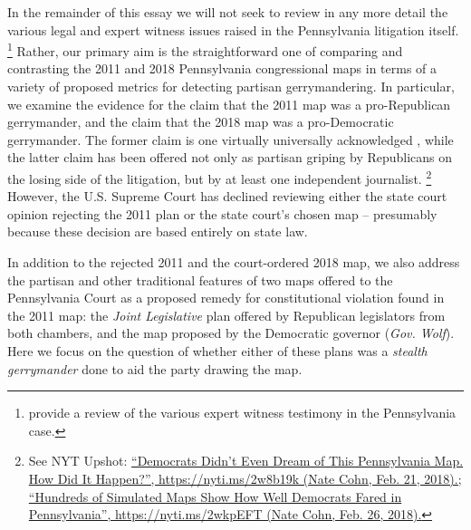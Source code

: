 \par
    In the remainder of this essay we will not seek to review in any more detail the various legal and expert witness issues raised in the Pennsylvania litigation itself.
        \footnote{\citet{Grofman_Cervas_2018_ELJ} provide a review of the various expert witness testimony in the Pennsylvania case.}
    Rather, our primary aim is the straightforward one of comparing and contrasting the 2011 and 2018 Pennsylvania congressional maps in terms of a variety of proposed metrics for detecting partisan gerrymandering. In particular, we examine the evidence for the claim that the 2011 map was a pro-Republican gerrymander, and the claim that the 2018 map was a pro-Democratic gerrymander. The former claim is one virtually universally acknowledged \citep{Fang2014, Mcgann_et_al_2015_ELJ, McGann_et_al_2016_gerrymandering, Wang2016_SLR, Wang2016_ELJ}, while the latter claim has been offered not only as partisan griping by Republicans on the losing side of the litigation, but by at least one independent journalist.
        \footnote{See NYT Upshot: \href{https://nyti.ms/2w8b19k}{``Democrats Didn’t Even Dream of This Pennsylvania Map. How Did It Happen?'', https://nyti.ms/2w8b19k (Nate Cohn, Feb. 21, 2018).;} \\
        \href{https://nyti.ms/2wkpEFT}{``Hundreds of Simulated Maps Show How Well Democrats Fared in Pennsylvania'', https://nyti.ms/2wkpEFT (Nate Cohn, Feb. 26, 2018).}}
    However, the U.S. Supreme Court has declined reviewing either the state court opinion rejecting the 2011 plan or the state court’s chosen map -- presumably because these decision are based entirely on state law.
\par
    In addition to the rejected 2011 and the court-ordered 2018 map, we also address the partisan and other traditional features of two maps offered to the Pennsylvania Court as a proposed remedy for constitutional violation found in the 2011 map: the \textit{Joint Legislative} plan offered by Republican legislators from both chambers, and the map proposed by the Democratic governor (\textit{Gov. Wolf}). Here we focus on the question of whether either of these plans was a \textit{stealth gerrymander} done to aid the party drawing the map.
